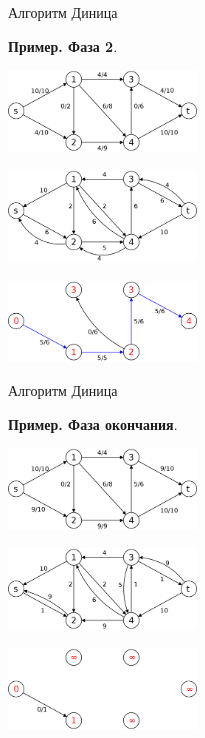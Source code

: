 \documentclass[10pt]{beamer}
\begin{document}
\begin{frame}[fragile]{Алгоритм Диница}

\textbf{Пример. Фаза 2}. 

\begin{center}
    \includegraphics[width=5cm]{Term_2/Source/images/8-dinica-4.png}
\end{center}
\begin{center}
    \includegraphics[width=5cm]{Term_2/Source/images/8-dinica-5.png}
\end{center}
\begin{center}
    \includegraphics[width=5cm]{Term_2/Source/images/8-dinica-6.png}
\end{center}
\end{frame}


\begin{frame}[fragile]{Алгоритм Диница}

\textbf{Пример. Фаза окончания}. 

\begin{center}
    \includegraphics[width=5cm]{Term_2/Source/images/8-dinica-7.png}
\end{center}
\begin{center}
    \includegraphics[width=5cm]{Term_2/Source/images/8-dinica-8.png}
\end{center}
\begin{center}
    \includegraphics[width=5cm]{Term_2/Source/images/8-dinica-9.png}
\end{center}
\end{frame}
\end{document}

